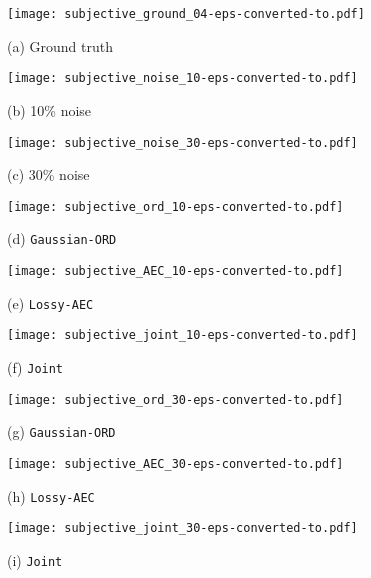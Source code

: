 \begin{figure}[t]

\begin{minipage}[b]{.32\linewidth}
  \centering
  \centerline{\texttt{[image: subjective\_ground\_04-eps-converted-to.pdf]}}
  \centerline{(a) Ground truth}\medskip
\end{minipage}
\hfill
\begin{minipage}[b]{0.32\linewidth}
  \centering
  \centerline{\texttt{[image: subjective\_noise\_10-eps-converted-to.pdf]}}
  \centerline{(b) 10\% noise}\medskip
\end{minipage}
\hfill
\begin{minipage}[b]{0.32\linewidth}
  \centering
  \centerline{\texttt{[image: subjective\_noise\_30-eps-converted-to.pdf]}}
  \centerline{(c) 30\% noise}\medskip
\end{minipage}
\vfill

\begin{minipage}[b]{.32\linewidth}
  \centering
  \centerline{\texttt{[image: subjective\_ord\_10-eps-converted-to.pdf]}}
  \centerline{(d) \texttt{Gaussian-ORD}}\medskip
\end{minipage}
\hfill
\begin{minipage}[b]{0.32\linewidth}
  \centering
  \centerline{\texttt{[image: subjective\_AEC\_10-eps-converted-to.pdf]}}
  \centerline{(e) \texttt{Lossy-AEC}}\medskip
\end{minipage}
\hfill
\begin{minipage}[b]{0.32\linewidth}
  \centering
  \centerline{\texttt{[image: subjective\_joint\_10-eps-converted-to.pdf]}}
  \centerline{(f) \texttt{Joint}}\medskip
\end{minipage}
\vfill

\begin{minipage}[b]{.32\linewidth}
  \centering
  \centerline{\texttt{[image: subjective\_ord\_30-eps-converted-to.pdf]}}
  \centerline{(g) \texttt{Gaussian-ORD}}\medskip
\end{minipage}
\hfill
\begin{minipage}[b]{0.32\linewidth}
  \centering
  \centerline{\texttt{[image: subjective\_AEC\_30-eps-converted-to.pdf]}}
  \centerline{(h) \texttt{Lossy-AEC}}\medskip
\end{minipage}
\hfill
\begin{minipage}[b]{0.32\linewidth}
  \centering
  \centerline{\texttt{[image: subjective\_joint\_30-eps-converted-to.pdf]}}
  \centerline{(i) \texttt{Joint}}\medskip
\end{minipage}


\end{figure}
